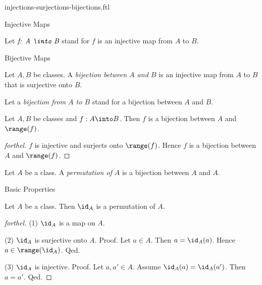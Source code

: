 \documentclass{naproche-library}
\begin{document}
\begin{smodule}[title={Injective, Surjective and Bijective Maps}]{injections-surjections-bijections.ftl}
\begin{sfragment}{Injective Maps}
\begin{definition}[forthel,id=FOUNDATIONS_08_605931408719872]
    Let $\emph{f: A \into B}$ stand for $f$ is an injective map from $A$ to $B$.
  \end{definition}
\end{sfragment}

\begin{sfragment}{Bijective Maps}
  \begin{definition}[forthel,id=FOUNDATIONS_08_3356670992318464]
    Let $A, B$ be classes.
    A \emph{bijection between $A$ and $B$} is an injective map from $A$ to $B$ that is surjective onto $B$.

    Let a \emph{bijection from $A$ to $B$} stand for a bijection between $A$ and $B$.
  \end{definition}

  \begin{proposition}[forthel,id=FOUNDATIONS_08_60881194975232]
    Let $A, B$ be classes and $f : A \into B$.
    Then $f$ is a bijection between $A$ and $\range(f)$.
  \end{proposition}
  \begin{proof}[forthel]
    $f$ is injective and surjects onto $\range(f)$.
    Hence $f$ is a bijection between $A$ and $\range(f)$.
  \end{proof}

  \begin{definition}[forthel,id=FOUNDATIONS_08_8188451318923264]
    Let $A$ be a class.
    A \emph{permutation of $A$} is a bijection between $A$ and $A$.
  \end{definition}
\end{sfragment}

\begin{sfragment}{Basic Properties}
  \begin{proposition}[forthel,id=FOUNDATIONS_08_7883784041005056]
    Let $A$ be a class.
    Then $\id_{A}$ is a permutation of $A$.
  \end{proposition}
  \begin{proof}[forthel]
    (1) $\id_{A}$ is a map on $A$.

    (2) $\id_{A}$ is surjective onto $A$. \newline
    Proof.
      Let $a \in A$.
      Then $a = \id_{A}(a)$.
      Hence $a \in \range(\id_{A})$.
    Qed.

    (3) $\id_{A}$ is injective. \newline
    Proof.
      Let $a, a' \in A$.
      Assume $\id_{A}(a) = \id_{A}(a')$.
      Then $a = a'$.
    Qed.
  \end{proof}


\end{sfragment}
\end{smodule}
\end{document}
